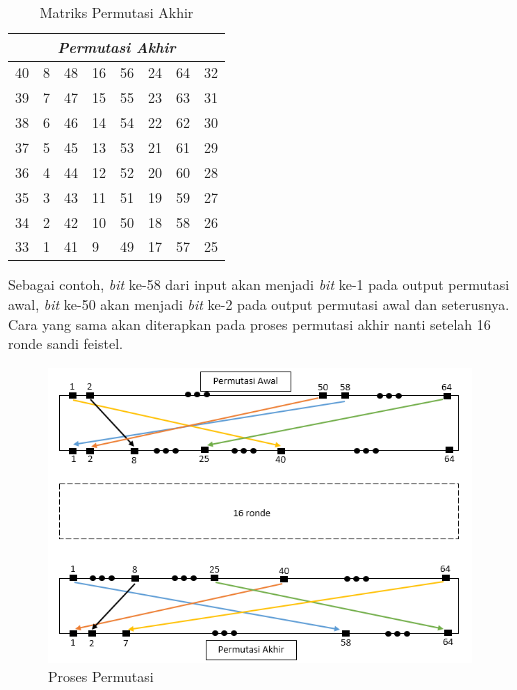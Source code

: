 \begin{table}
	\begin{center}
		\begin{tabular}{|l|l|l|l|l|l|l|l|}
				\hline
				\multicolumn{8}{|c|}{\textit{Permutasi Akhir}} \\
				\hline
				40	&	8	&	48	&	16	&	56	&	24	&	64	&	32	\\ \hline
				39	&	7	&	47	&	15	&	55	&	23	&	63	&	31	\\ \hline
				38	&	6	&	46	&	14	&	54	&	22	&	62	&	30	\\ \hline
				37	&	5	&	45	&	13	&	53	&	21	&	61	&	29	\\ \hline
				36	&	4	&	44	&	12	&	52	&	20	&	60	&	28	\\ \hline
				35	&	3	&	43	&	11	&	51	&	19	&	59	&	27	\\ \hline
				34	&	2	&	42	&	10	&	50	&	18	&	58	&	26	\\ \hline
				33	&	1	&	41	&	9		&	49	&	17	&	57	&	25	\\ \hline
		\end{tabular}
	\end{center}
	\caption{Matriks Permutasi Akhir}\label{table:akhir}
\end{table}

Sebagai contoh, \textit{bit} ke-58 dari input akan menjadi \textit{bit} ke-1 pada output permutasi awal, \textit{bit} ke-50 akan menjadi \textit{bit} ke-2 pada output permutasi awal dan seterusnya. Cara yang sama akan diterapkan pada proses permutasi akhir nanti setelah 16 ronde sandi feistel.

\begin{figure}[h]
\includegraphics[scale=0.5]{Gambar/proses_permutasi}
\centering
\caption{Proses Permutasi}
\end{figure}

